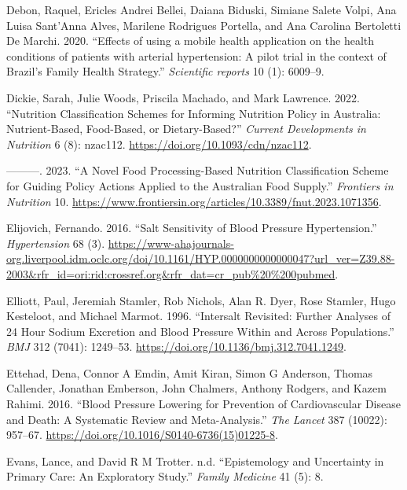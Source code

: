 \documentclass[
]{article}
\newlength{\cslhangindent}
\newlength{\cslentryspacingunit} %
\newenvironment{CSLReferences}[2] %
 {%
  \setlength{\parindent}{0pt}
  \ifodd #1
  \let\oldpar\par
  \def\par{\hangindent=\cslhangindent\oldpar}
  \fi
  \setlength{\parskip}{#2\cslentryspacingunit}
 }%
 {}
\begin{document}
\begin{CSLReferences}{1}{0}
\leavevmode{}%
Debon, Raquel, Ericles Andrei Bellei, Daiana Biduski, Simiane Salete
Volpi, Ana Luisa Sant'Anna Alves, Marilene Rodrigues Portella, and Ana
Carolina Bertoletti De Marchi. 2020. {``Effects of using a mobile health
application on the health conditions of patients with arterial
hypertension: A pilot trial in the context of Brazil's Family Health
Strategy.''} \emph{Scientific reports} 10 (1): 6009--9.

\leavevmode{}%
Dickie, Sarah, Julie Woods, Priscila Machado, and Mark Lawrence. 2022.
{``Nutrition Classification Schemes for Informing Nutrition Policy in
Australia: Nutrient-Based, Food-Based, or Dietary-Based?''}
\emph{Current Developments in Nutrition} 6 (8): nzac112.
\url{https://doi.org/10.1093/cdn/nzac112}.

\leavevmode{}%
---------. 2023. {``A Novel Food Processing-Based Nutrition
Classification Scheme for Guiding Policy Actions Applied to the
Australian Food Supply.''} \emph{Frontiers in Nutrition} 10.
\url{https://www.frontiersin.org/articles/10.3389/fnut.2023.1071356}.

\leavevmode{}%
Elijovich, Fernando. 2016. {``Salt Sensitivity of Blood Pressure
\textbar{} Hypertension.''} \emph{Hypertension} 68 (3).
\url{https://www-ahajournals-org.liverpool.idm.oclc.org/doi/10.1161/HYP.0000000000000047?url_ver=Z39.88-2003\&rfr_id=ori:rid:crossref.org\&rfr_dat=cr_pub\%20\%200pubmed}.

\leavevmode{}%
Elliott, Paul, Jeremiah Stamler, Rob Nichols, Alan R. Dyer, Rose
Stamler, Hugo Kesteloot, and Michael Marmot. 1996. {``Intersalt
Revisited: Further Analyses of 24 Hour Sodium Excretion and Blood
Pressure Within and Across Populations.''} \emph{BMJ} 312 (7041):
1249--53. \url{https://doi.org/10.1136/bmj.312.7041.1249}.

\leavevmode{}%
Ettehad, Dena, Connor A Emdin, Amit Kiran, Simon G Anderson, Thomas
Callender, Jonathan Emberson, John Chalmers, Anthony Rodgers, and Kazem
Rahimi. 2016. {``Blood Pressure Lowering for Prevention of
Cardiovascular Disease and Death: A Systematic Review and
Meta-Analysis.''} \emph{The Lancet} 387 (10022): 957--67.
\url{https://doi.org/10.1016/S0140-6736(15)01225-8}.

\leavevmode{}%
Evans, Lance, and David R M Trotter. n.d. {``Epistemology and
Uncertainty in Primary Care: An Exploratory Study.''} \emph{Family
Medicine} 41 (5): 8.


\end{CSLReferences}
\end{document}
